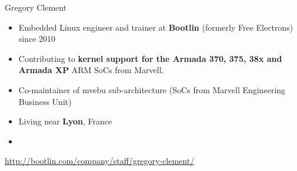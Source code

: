 \begin{frame}{Gregory Clement}
    \begin{itemize}
	\item Embedded Linux engineer and trainer at {\bf Bootlin}
              (formerly Free Electrons) since 2010
	\item Contributing to {\bf kernel support for the Armada 370, 375, 38x and
	      Armada XP} ARM SoCs from Marvell.
	\item Co-maintainer of mvebu sub-architecture (SoCs from Marvell
    	      Engineering Business Unit)
	\item Living near {\bf Lyon}, France
	\item {}
    \end{itemize}
    {\small \url{http://bootlin.com/company/staff/gregory-clement/}}
\end{frame}
